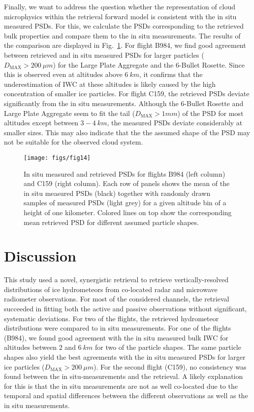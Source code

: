 \documentclass[journal abbreviation, manuscript]{copernicus}
\begin{document}
Finally, we want to address the question whether the representation of cloud
microphysics within the retrieval forward model is consistent with the in situ
measured PSDs. For this, we calculate the PSDs corresponding to the retrieved
bulk properties and compare them to the in situ measurements. The results of the
comparison are displayed in Fig.~\ref{fig:in_situ_psds}. For flight B984, we
find good agreement between retrieved and in situ measured PSDs for larger
particles ($D_\text{MAX} > 200 \ \unit{\mu m}$) for the Large Plate Aggregate
and the 6-Bullet Rosette. Since this is observed even at altitudes above $6
\ \unit{km}$, it confirms that the underestimation of IWC at these altitudes is
likely caused by the high concentration of smaller ice particles. For flight
C159, the retrieved PSDs deviate significantly from the in situ measurements.
Although the 6-Bullet Rosette and Large Plate Aggregate seem to fit the tail
($D_\text{MAX} > 1 \unit{mm}$) of the PSD for most altitudes except between $3 -
4\ \unit{km}$, the measured PSDs deviate considerably at smaller sizes. This may
also indicate that the the assumed shape of the PSD may not be suitable for the
observed cloud system.

\begin{figure}[!hbpt]
  \centering
  \texttt{[image: figs/fig14]}
  \caption{In situ measured and retrieved PSDs for flights B984 (left column)
    and C159 (right column). Each row of panels shows the mean of the
    in situ measured PSDs (black) together with randomly drawn samples of
    measured PSDs (light grey) for a given altitude bin of a height of one
    kilometer. Colored lines on top show the corresponding mean retrieved PSD
    for different assumed particle shapes.}
  \label{fig:in_situ_psds}
\end{figure}

\section{Discussion}
\label{sec:discussion}

This study used a novel, synergistic retrieval to retrieve vertically-resolved
distributions of ice hydrometeors from co-located radar and microwave radiometer
observations. For most of the considered channels, the retrieval succeeded in
fitting both the active and passive observations without significant, systematic
deviations. For two of the flights, the retrieved hydrometeor distributions were
compared to in situ measurements. For one of the flights (B984), we found good
agreement with the in situ measured bulk IWC for altitudes between $2$ and
$6\ \unit{km}$ for two of the particle shapes. The same particle shapes also
yield the best agreements with the in situ measured PSDs for larger ice
particles ($D_\text{MAX} > 200\ \unit{\mu m}$). For the second flight (C159), no
consistency was found between the in situ-measurements and the retrieval. A
likely explanation for this is that the in situ measurements are not as well
co-located due to the temporal and spatial differences between the different
observations as well as the in situ measurements.
\end{document}
